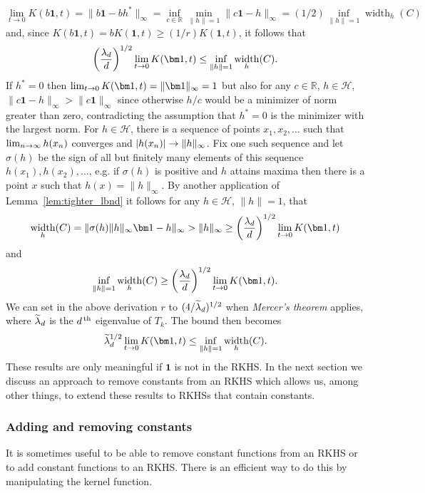\documentclass[AHL,Unicode,longabstracts,published]{cedram}
\theoremstyle{remark}
\DeclareMathOperator{\diam}{width}
\newcommand{\R}{\mathbb{R}}
\newcommand{\cH}{\mathcal{H}}
\let\oldtilde\tilde
\renewcommand*{\tilde}[1]{\mathchoice{\widetilde{#1}}{\widetilde{#1}}{\oldtilde{#1}}{\oldtilde{#1}}}
\renewcommand*{\to}{\mathchoice{\longrightarrow}{\rightarrow}{\rightarrow}{\rightarrow}}
\let\originalleft\left
\let\originalright\right
\renewcommand{\left}{\mathopen{}\mathclose\bgroup\originalleft}
\renewcommand{\right}{\aftergroup\egroup\originalright}
\begin{document}
\[
\lim_{t \rightarrow 0} K(b \bm 1,t) = \|b\bm 1 - b h^*\|_\infty = \inf_{c\in\R} \min_{\|h\|=1} \|c\bm 1 - h\|_\infty = (1/2) \inf_{\|h\| =1} \diam_h(C)
\]
and, since $K(b\bm 1,t) = b K(\bm 1,t) \geq (1/r) K(\bm 1,t)$, it follows that
\begin{equation}\label{eq:K_functional_LB}
\left(\frac{\lambda_d}{d}\right)^{1/2} \lim_{t\rightarrow 0} K(\bm 1,t) \leq \inf_{\|h\|=1} \diam_h(C).
\end{equation}
If $h^* = 0$ then $\lim_{t\to 0} K(\bm 1,t) = \|\bm 1\|_\infty = 1$ but also for any $c\in \R$, $h \in \cH$, $\|c \bm 1 - h\|_\infty >
\|c \bm 1\|_\infty$ since otherwise $h/c$ would be a minimizer of norm greater than zero, contradicting the assumption that $h^* = 0 $ is the minimizer with the largest norm. For $h \in \cH$, there is a sequence of points $x_1,x_2,\dots$ such that $\lim_{n\to \infty} h(x_n)$ converges and $|h(x_n)|\to \|h\|_\infty$. Fix one such sequence and let $\sigma(h)$ be the sign of all but finitely many elements of this sequence $h(x_1),h(x_2),\dots$, e.g. if $\sigma(h)$ is positive and $h$ attains maxima then there is a point $x$ such that $h(x) = \|h\|_\infty$. By another application of Lemma~\ref{lem:tighter_lbnd} it follows for any $h\in \cH$, $\|h\|=1$, that
\[
\diam_h(C) = \| \sigma(h) \|h\|_\infty \bm 1 - h \|_\infty > \|h\|_\infty \geq \left(\frac{\lambda_d}{d}\right)^{1/2} \lim_{t\to 0} K(\bm 1,t)
\]
and
\[
\inf_{\|h\|=1} \diam_h(C) \geq \left(\frac{\lambda_d}{d}\right)^{1/2} \lim_{t\to 0} K(\bm 1,t).
\]
We can set in the above derivation $r$ to $(4/\tilde \lambda_d)^{1/2}$ when \emph{Mercer's theorem} applies, where $\tilde \lambda_d$ is the $d^{\,\rm th}$ eigenvalue of $T_k$. The bound then becomes
\[
\tilde \lambda_d^{1/2} \lim_{t\rightarrow 0} K(\bm 1,t) \leq \inf_{\|h\|=1} \diam_h(C).
\]
These results are only meaningful if $\bm 1$ is not in the RKHS. In the next section we discuss an approach to remove constants from an RKHS which allows us, among other things, to extend these results to RKHSs that contain constants.



\subsubsection{Adding and removing constants} \label{sec:add_remove_constants}
It is sometimes useful to be able to remove constant functions from an RKHS or to add constant functions to an RKHS. There is an efficient way to do this by manipulating the kernel function.
\end{document}
